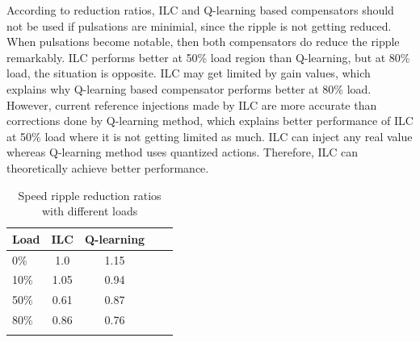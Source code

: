 According to reduction ratios, ILC and Q-learning based compensators should not be used if pulsations are minimial, since the ripple is not getting reduced. When pulsations become notable, then both compensators do reduce the ripple remarkably. ILC performs better at 50\% load region than Q-learning, but at 80\% load, the situation is opposite. ILC may get limited by gain values, which explains why Q-learning based compensator performs better at 80\% load. However, current reference injections made by ILC are more accurate than corrections done by Q-learning method, which explains better performance of ILC at 50\% load where it is not getting limited as much. ILC can inject any real value whereas Q-learning method uses quantized actions. Therefore, ILC can theoretically achieve better performance.
\begin{table}[htb]
\caption{Speed ripple reduction ratios with different loads}
\centering
\begin{tabular}[t]{lcccc}
\hline
Load & ILC & Q-learning\\
\hline
0\%   & 1.0   & 1.15\\
10\%  & 1.05  & 0.94 \\
50\%  & 0.61  & 0.87 \\
80\%  & 0.86  & 0.76 \\
\hline
\label{Tbl:reduction}
\end{tabular}
\end{table}%

\clearpage
